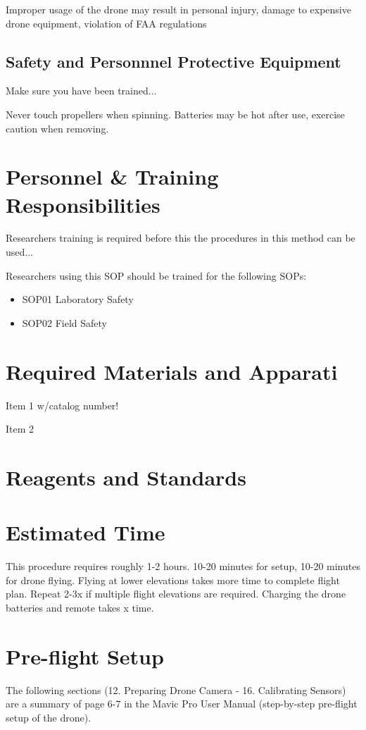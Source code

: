 \documentclass[12pt]{../SOP4_alpha}\usepackage[]{graphicx}\usepackage[]{color}
\begin{document}
\NP Improper usage of the drone may result in personal injury, damage to expensive drone equipment, violation of FAA regulations


\subsection{Safety and Personnnel Protective Equipment}

\NP Make sure you have been trained... 

\NP Never touch propellers when spinning. Batteries may be hot after use, exercise caution when removing.

\section{Personnel \& Training Responsibilities}

\NP Researchers training is required before this the procedures in this method can be used... 

\NP Researchers using this SOP should be trained for the following SOPs:

\begin{itemize}
  \item SOP01 Laboratory Safety
  \item SOP02 Field Safety
\end{itemize}

\section{Required Materials and Apparati}

\NP Item 1 w/catalog number!

\NP Item 2

\section{Reagents and Standards}

\section{Estimated Time}

\NP This procedure requires roughly 1-2 hours. 10-20 minutes for setup, 10-20 minutes for drone flying. Flying at lower elevations takes more time to complete flight plan. Repeat 2-3x if multiple flight elevations are required. Charging the drone batteries and remote takes x time. 

\section{Pre-flight Setup}
\NP The following sections (12. Preparing Drone Camera - 16. Calibrating Sensors) are a summary of page 6-7 in the Mavic Pro User Manual (step-by-step pre-flight setup of the drone). 
\end{document}
